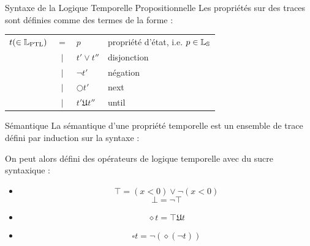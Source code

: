 \documentclass{cours}
\begin{document}
\begin{définition}{Syntaxe de la Logique Temporelle Propositionnelle}{}
Les propriétés sur des traces sont définies comme des termes de la forme :
\begin{tabular}{rcll}
	$t(\in \mathbb{L}_{\rm PTL})$ & $=$    & $p$                   & propriété d'état, i.e. $p \in \mathbb{L}_{\mathbb{S}}$ \\
	                      & $\mid$ & $t' \lor t''$         & disjonction                            \\
	                      & $\mid$ & $\lnot t'$            & négation                               \\
	                      & $\mid$ & $\bigcirc t'$         & next                                   \\
	                      & $\mid$ & $t' \mathfrak{U} t''$ & until
\end{tabular}
\end{définition}

\begin{définition}{Sémantique}{}
La sémantique d'une propriété temporelle est un ensemble de trace défini par induction sur la syntaxe :
\end{définition}

On peut alors défini des opérateurs de logique temporelle avec du sucre syntaxique :
\begin{itemize}
	\item[Constantes Booléennes]
	      \[
		      \top = (x < 0) \lor \lnot (x < 0)
	      \]
	      \[
		      \bot = \lnot \top
	      \]
	\item[À un moment]
	      \[
		      \diamond t = \top \mathfrak{U} t
	      \]
	\item[Toujours]
	      \[
		      \square t = \lnot\left(\diamond \left(\lnot t\right)\right)
	      \]
\end{itemize}
\end{document}
